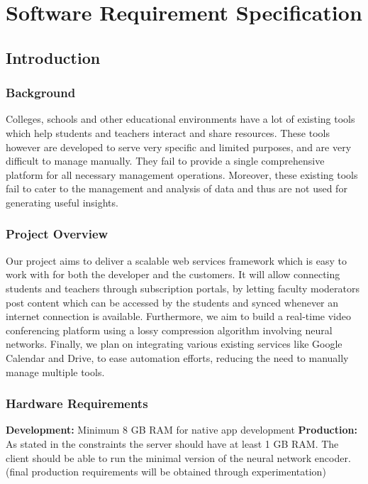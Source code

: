 \chapter{Software Requirement Specification}

\section{Introduction}

\subsection{Background}

Colleges, schools and other educational environments have a lot of existing tools 
which help students and teachers interact and share resources.
These tools however are developed to serve very specific and limited purposes, and are very difficult to 
manage manually. They fail to provide a single comprehensive platform for all 
necessary management operations. Moreover, these existing tools fail to cater to the 
management and analysis of data and thus are not used for generating useful 
insights.

\subsection{Project Overview}

Our project aims to deliver a scalable web services framework which is easy to work 
with for both the developer and the customers. It will allow connecting students and 
teachers through subscription portals, by letting faculty moderators post content 
which can be accessed by the students and synced whenever an internet connection 
is available. Furthermore, we aim to build a real-time video conferencing platform 
using a lossy compression algorithm involving neural networks. Finally, we plan on 
integrating various existing services like Google Calendar and Drive, to ease 
automation efforts, reducing the need to manually manage multiple tools.

\subsection{Hardware Requirements}

\textbf{Development:} 
Minimum 8 GB RAM for native app development
\textbf{Production:} 
As stated in the constraints the server should have at least 1 GB RAM.
The client should be able to run the minimal version of the neural network encoder.
(final production requirements will be obtained through experimentation)

